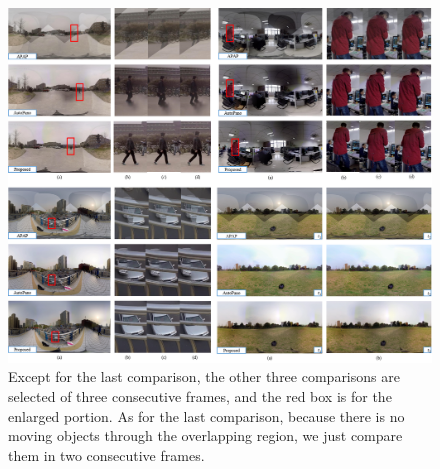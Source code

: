\documentclass[conference]{IEEEtran}
\begin{document}


\begin{figure}
\centering
\includegraphics[scale=0.76]{picture64.png}
\caption{
Except for the last comparison, 
the other three comparisons are selected of three consecutive frames, and the red box is for the enlarged portion.
As for the last comparison, because there is no moving objects through the overlapping region, we just compare them in two consecutive frames.}
\label{fig:more}
\end{figure}


\end{document}
